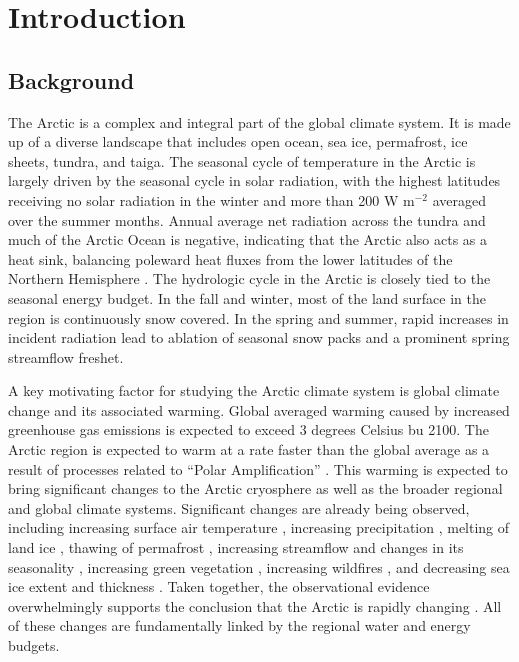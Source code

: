 \chapter{Introduction}
\label{chap:intro}

\section{Background}

The Arctic is a complex and integral part of the global climate system.
It is made up of a diverse landscape that includes open ocean, sea ice, permafrost, ice sheets, tundra, and taiga.
The seasonal cycle of temperature in the Arctic is largely driven by the seasonal cycle in solar radiation, with the highest latitudes receiving no solar radiation in the winter and more than 200 W m$^{-2}$ averaged over the summer months.
Annual average net radiation across the tundra and much of the Arctic Ocean is negative, indicating that the Arctic also acts as a heat sink, balancing poleward heat fluxes from the lower latitudes of the Northern Hemisphere \citep{Serreze_2007}.
The hydrologic cycle in the Arctic is closely tied to the seasonal energy budget.
In the fall and winter, most of the land surface in the region is continuously snow covered.
In the spring and summer, rapid increases in incident radiation lead to ablation of seasonal snow packs and a prominent spring streamflow freshet.

A key motivating factor for studying the Arctic climate system is global climate change and its associated warming.
Global averaged warming caused by increased greenhouse gas emissions is expected to exceed 3 degrees Celsius \citep{IPCC_2014} bu 2100.
The Arctic region is expected to warm at a rate faster than the global average as a result of processes related to ``Polar Amplification'' \citep[e.g.][]{Serreze_2006c,Holland_2003}.
This warming is expected to bring significant changes to the Arctic cryosphere as well as the broader regional and global climate systems.
Significant changes are already being observed, including increasing surface air temperature \citep[e.g.][]{Rigor_2000}, increasing precipitation \citep[e.g.][]{Min_2008}, melting of land ice \citep[e.g.][]{Gardner_2011}, thawing of permafrost \citep[e.g.]{Serreze_2000,Osterkamp_1999}, increasing streamflow and changes in its seasonality \citep[e.g.][]{Dai_2009,McClelland_2006,Peterson_2002,Smith_2007,StJacques_2009}, increasing green vegetation \citep[e.g.][]{Stow_2004,Xu_2013}, increasing wildfires \citep[e.g.][]{Kely_2013}, and decreasing sea ice extent and thickness \citep[e.g.][]{Serreze_2000,Maslowski_2012}.
Taken together, the observational evidence overwhelmingly supports the conclusion that the Arctic is rapidly changing \citep{Serreze_2006b}.
All of these changes are fundamentally linked by the regional water and energy budgets.

